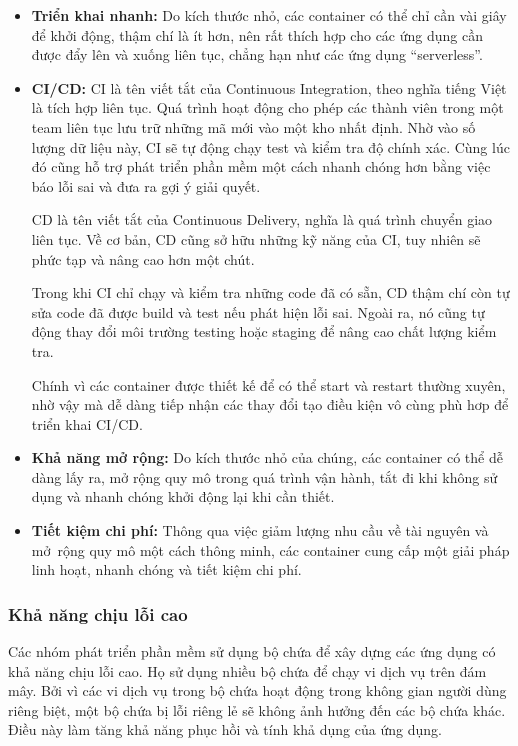 \documentclass[14pt,a4paper]{book}
\begin{document}
		\begin{itemize}
			\item \textbf{Triển khai nhanh:}
			\subitem Do kích thước nhỏ, các container có thể chỉ cần vài giây để khởi động, thậm chí là ít hơn, nên rất thích hợp cho các ứng dụng cần được đẩy lên và xuống liên tục, chẳng hạn như các ứng dụng “serverless”.
			\item \textbf{\textbf{CI/CD:}}
			\subitem 
			CI là tên viết tắt của Continuous Integration, theo nghĩa tiếng Việt là tích hợp liên tục. Quá trình hoạt động cho phép các thành viên trong một team liên tục lưu trữ những mã mới vào một kho nhất định. Nhờ vào số lượng dữ liệu này, CI sẽ tự động chạy test và kiểm tra độ chính xác. Cùng lúc đó cũng hỗ trợ phát triển phần mềm một cách nhanh chóng hơn bằng việc báo lỗi sai và đưa ra gợi ý giải quyết.
			
			\hspace{0,8cm}CD là tên viết tắt của Continuous Delivery, nghĩa là quá trình chuyển giao liên tục. Về cơ bản, CD cũng sở hữu những kỹ năng của CI, tuy nhiên sẽ phức tạp và nâng cao hơn một chút.
			
			\hspace{0,8cm}Trong khi CI chỉ chạy và kiểm tra những code đã có sẵn, CD thậm chí còn tự sửa code đã được build và test nếu phát hiện lỗi sai. Ngoài ra, nó cũng tự động thay đổi môi trường testing hoặc staging để nâng cao chất lượng kiểm tra.
			
			\hspace{0,8cm}Chính vì các container được thiết kế để có thể start và restart thường xuyên, nhờ vậy mà dễ dàng tiếp nhận các thay đổi tạo điều kiện vô cùng phù hơp để triển khai CI/CD.
			\item \textbf{Khả năng mở rộng:}
			\subitem Do kích thước nhỏ của chúng, các container có thể dễ dàng lấy ra, mở rộng quy mô trong quá trình vận hành, tắt đi khi không sử dụng và nhanh chóng khởi động lại khi cần thiết.
			\item \textbf{Tiết kiệm chi phí:}
			\subitem Thông qua việc giảm lượng nhu cầu về tài nguyên và mở rộng quy mô một cách thông minh, các container cung cấp một giải pháp linh hoạt, nhanh chóng và tiết kiệm chi phí.
		\end{itemize}
			\subsubsection{Khả năng chịu lỗi cao}
		\hspace{0.6cm}Các nhóm phát triển phần mềm sử dụng bộ chứa để xây dựng các ứng dụng có khả năng chịu lỗi cao. Họ sử dụng nhiều bộ chứa để chạy vi dịch vụ trên đám mây. Bởi vì các vi dịch vụ trong bộ chứa hoạt động trong không gian người dùng riêng biệt, một bộ chứa bị lỗi riêng lẻ sẽ không ảnh hưởng đến các bộ chứa khác. Điều này làm tăng khả năng phục hồi và tính khả dụng của ứng dụng.
\end{document}
